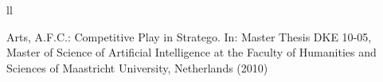 \documentclass[12pt,bulgarian,singlespacing,headsepline,oneside,openany]{thesis}
\begin{document}
\begin{abbreviations}{ll}
\end{abbreviations}


\mainmatter

\pagestyle{thesis}

\renewcommand\thesection{\thechapter.\arabic{section}}
\renewcommand\thesubsection{\thesection.\arabic{subsection}}


 
%
% 
% 


\appendix

%
%
%


\newpage
\begin{thebibliography}{99}

 Arts, A.F.C.: Competitive Play in Stratego. In: Master Thesis DKE 10-05, Master of Science of Artificial Intelligence at the Faculty of Humanities and Sciences of Maastricht University, Netherlands (2010)

\end{thebibliography}


\newpage
\printindex
\end{document}
